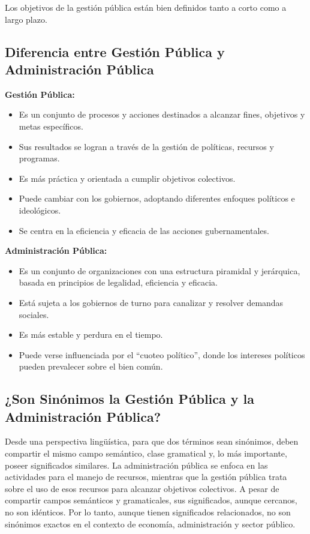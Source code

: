 \documentclass[
  jou,
  floatsintext,
  longtable,
  a4paper,
  nolmodern,
  notxfonts,
  notimes,
  colorlinks=true,linkcolor=blue,citecolor=blue,urlcolor=blue]{apa7}
\providecommand{\tightlist}{%
  \setlength{\itemsep}{0pt}\setlength{\parskip}{0pt}}
\begin{document}
Los objetivos de la gestión pública están bien definidos tanto a corto
como a largo plazo.

\subsection{Diferencia entre Gestión Pública y Administración
Pública}\label{diferencia-entre-gestiuxf3n-puxfablica-y-administraciuxf3n-puxfablica}

\textbf{Gestión Pública:}

\begin{itemize}
\tightlist
\item
  Es un conjunto de procesos y acciones destinados a alcanzar fines,
  objetivos y metas específicos.
\item
  Sus resultados se logran a través de la gestión de políticas, recursos
  y programas.
\item
  Es más práctica y orientada a cumplir objetivos colectivos.
\item
  Puede cambiar con los gobiernos, adoptando diferentes enfoques
  políticos e ideológicos.
\item
  Se centra en la eficiencia y eficacia de las acciones gubernamentales.
\end{itemize}

\textbf{Administración Pública:}

\begin{itemize}
\tightlist
\item
  Es un conjunto de organizaciones con una estructura piramidal y
  jerárquica, basada en principios de legalidad, eficiencia y eficacia.
\item
  Está sujeta a los gobiernos de turno para canalizar y resolver
  demandas sociales.
\item
  Es más estable y perdura en el tiempo.
\item
  Puede verse influenciada por el ``cuoteo político'', donde los
  intereses políticos pueden prevalecer sobre el bien común.
\end{itemize}

\subsection{¿Son Sinónimos la Gestión Pública y la Administración
Pública?}\label{son-sinuxf3nimos-la-gestiuxf3n-puxfablica-y-la-administraciuxf3n-puxfablica}

Desde una perspectiva lingüística, para que dos términos sean sinónimos,
deben compartir el mismo campo semántico, clase gramatical y, lo más
importante, poseer significados similares. La administración pública se
enfoca en las actividades para el manejo de recursos, mientras que la
gestión pública trata sobre el uso de esos recursos para alcanzar
objetivos colectivos. A pesar de compartir campos semánticos y
gramaticales, sus significados, aunque cercanos, no son idénticos. Por
lo tanto, aunque tienen significados relacionados, no son sinónimos
exactos en el contexto de economía, administración y sector público.
\end{document}
